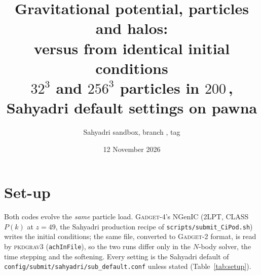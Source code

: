 \documentclass[11pt,a4paper]{article}
\title{Gravitational potential, particles and halos:\\ \gad{} versus \pkd{} from identical initial conditions\\
\large $32^3$ and $256^3$ particles in $200$\,\Mpch, Sahyadri default settings on pawna}
\author{Sahyadri sandbox, branch \fp{rockstar-pkc-reader}, tag \fp{potcmp-256-report}}
\date{12 November 2026}
\newcommand{\pkd}{\textsc{pkdgrav3}}
\newcommand{\gad}{\textsc{Gadget-4}}
\newcommand{\fp}[1]{\nolinkurl{#1}}
\begin{document}
\maketitle



\tableofcontents

\section{Set-up}
\label{sec:setup}

Both codes evolve the \emph{same} particle load. \gad{}'s NGenIC (2LPT, CLASS $P(k)$ at $z=49$, the Sahyadri
production recipe of \fp{scripts/submit_CiPod.sh}) writes the initial conditions; the same file, converted to
\textsc{Gadget-2} format, is read by \pkd{} (\fp{achInFile}), so the two runs differ only in the $N$-body solver,
the time stepping and the softening. Every setting is the Sahyadri default of
\fp{config/submit/sahyadri/sub_default.conf} unless stated (Table~\ref{tab:setup}).
\end{document}
